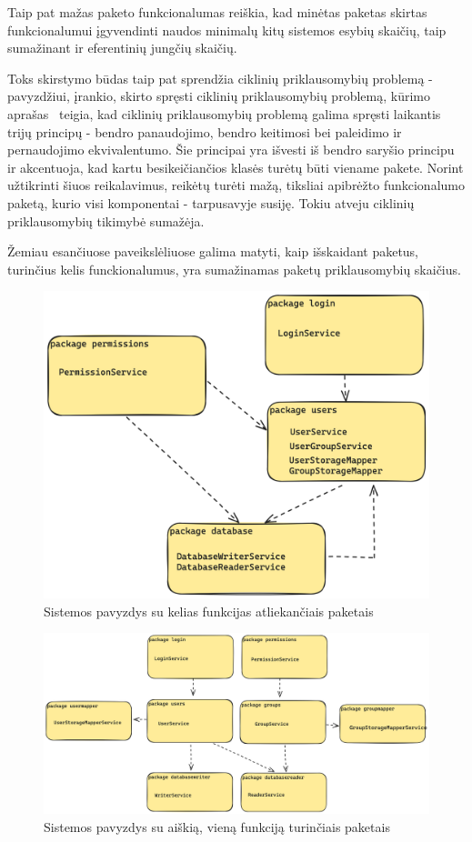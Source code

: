 Taip pat mažas paketo funkcionalumas reiškia, kad minėtas paketas skirtas funkcionalumui įgyvendinti naudos minimalų kitų sistemos esybių skaičių,
taip sumažinant ir eferentinių jungčių skaičių.

Toks skirstymo būdas taip pat sprendžia ciklinių priklausomybių problemą - pavyzdžiui, įrankio, skirto spręsti ciklinių priklausomybių problemą,
 kūrimo aprašas~\cite{CircularDependencies} teigia, kad ciklinių priklausomybių problemą galima spręsti laikantis trijų principų -
bendro panaudojimo, bendro keitimosi bei paleidimo ir pernaudojimo ekvivalentumo.
Šie principai yra išvesti iš bendro saryšio principu ir akcentuoja, kad kartu besikeičiančios klasės turėtų būti viename pakete.
Norint užtikrinti šiuos reikalavimus, reikėtų turėti mažą,
tiksliai apibrėžto funkcionalumo paketą, kurio visi komponentai - tarpusavyje susiję. Tokiu atveju ciklinių priklausomybių tikimybė sumažėja.

Žemiau esančiuose paveikslėliuose galima matyti, kaip išskaidant paketus, turinčius kelis funckionalumus, yra sumažinamas paketų
priklausomybių skaičius.
\begin{figure}[H]
    \centering
    \includegraphics[scale=0.15]{img/excesive_deps}
    \caption{Sistemos pavyzdys su kelias funkcijas atliekančiais paketais}
    \label{img:excesive_deps}
\end{figure}


\begin{figure}[H]
    \centering
    \includegraphics[scale=0.13]{img/good_deps}
    \caption{Sistemos pavyzdys su aiškią, vieną funkciją turinčiais paketais}
    \label{img:good_deps}
\end{figure}

